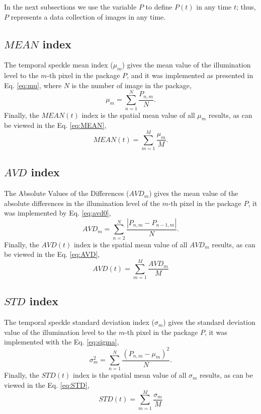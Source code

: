 \documentclass[review]{elsarticle}
\begin{document}
In the next subsections we use the variable $P$ to define $P(t)$ in any time $t$;
thus, $P$ represents a data collection of images in any time.

\subsection{$MEAN$ index }
\label{sec:mean}

The temporal speckle mean index ($\mu_{m}$) \cite{Nothdurft:05} gives the mean
value of the illumination level to the $m$-th pixel in the package $P$, 
and it was  implemented as presented in Eq. \ref{eq:mu}, where $N$ is the number of image in the package,
\begin{equation}\label{eq:mu}
\mu_{m} = \sum \limits_{n=1}^{N} \frac{P_{n,m}}{N}.
\end{equation}
Finally, the $MEAN(t)$ index is the spatial mean value of all $\mu_{m}$ results,
as can be viewed in the Eq. \ref{eq:MEAN},
\begin{equation}\label{eq:MEAN}
MEAN(t) = \sum \limits_{m=1}^{M} \frac{\mu_{m}}{M}.
\end{equation}


\subsection{$AVD$ index}
\label{sec:avd}

The Absolute Values of the Differences ($AVD_{m}$) \cite{cardoso2014,rivera2017selection} gives the mean
value of the absolute differences in the illumination level of the $m$-th pixel in the package $P$, it was  implemented
by Eq. \ref{eq:avd0},
\begin{equation}\label{eq:avd0}
AVD_{m} = \sum \limits_{n=2}^{N} \frac{|P_{n,m}-P_{n-1,m}|}{N}.
\end{equation}
Finally, the $AVD(t)$ index is the spatial mean value of all $AVD_{m}$ results,
as can be viewed in the Eq. \ref{eq:AVD},
\begin{equation}\label{eq:AVD}
AVD(t) = \sum \limits_{m=1}^{M} \frac{AVD_{m}}{M}
\end{equation}



\subsection{$STD$ index}
\label{sec:std}


The temporal speckle standard deviation index ($\sigma_{m}$) \cite{Nothdurft:05} gives the standard deviation
value of the illumination level to the $m$-th pixel in the package $P$, it was implemented
with the Eq. \ref{eq:sigma},
\begin{equation}\label{eq:sigma}
\sigma_{m}^2 = \sum \limits_{n=1}^{N} \frac{(P_{n,m}-\mu_{m})^2}{N}.
\end{equation}
Finally, the $STD(t)$ index is the spatial mean value of all $\sigma_{m}$ results,
as can be viewed in the Eq. \ref{eq:STD},
\begin{equation}\label{eq:STD}
STD(t) = \sum \limits_{m=1}^{M} \frac{\sigma_{m}}{M}
\end{equation}
\end{document}
